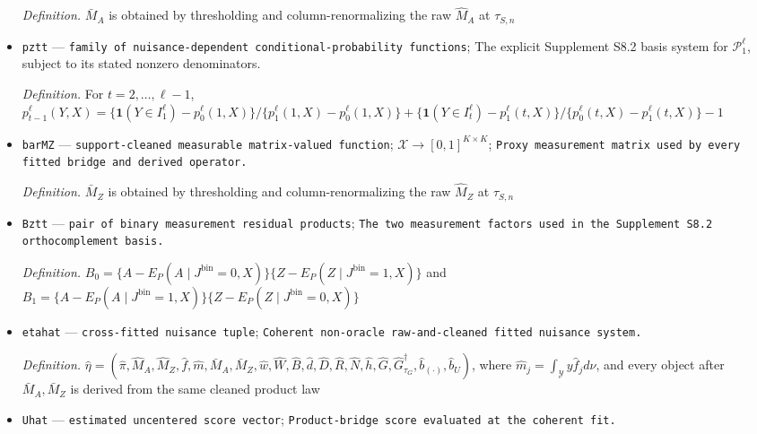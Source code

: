 \documentclass{article}
\begin{document}
\begin{itemize}
  \par\smallskip\noindent\emph{Definition.} \(\bar M_A\) is obtained by thresholding and column-renormalizing the raw \(\widehat M_A\) at \(\tau_{S,n}\)
  \item \texttt{pztt} --- \texttt{family of nuisance-\allowbreak{}dependent conditional-\allowbreak{}probability functions}; The explicit Supplement S8.2 basis system for \(\mathcal P_1^{\ell}\), subject to its stated nonzero denominators.
  \par\smallskip\noindent\emph{Definition.} For \(t=2,\ldots,\ell-1\), \(p_{t-1}^{\ell}(Y,X)=\{\mathbf 1(Y\in I_1^{\ell})-p_0^{\ell}(1,X)\}/\{p_1^{\ell}(1,X)-p_0^{\ell}(1,X)\}+\{\mathbf 1(Y\in I_t^{\ell})-p_1^{\ell}(t,X)\}/\{p_0^{\ell}(t,X)-p_1^{\ell}(t,X)\}-1\)
  \item \texttt{barMZ} --- \texttt{support-\allowbreak{}cleaned measurable matrix-\allowbreak{}valued function}; \(\mathcal X\to[0,1]^{K\times K}\); \texttt{Proxy measurement matrix used by every fitted bridge and derived operator.}
  \par\smallskip\noindent\emph{Definition.} \(\bar M_Z\) is obtained by thresholding and column-renormalizing the raw \(\widehat M_Z\) at \(\tau_{S,n}\)
  \item \texttt{Bztt} --- \texttt{pair of binary measurement residual products}; \texttt{The two measurement factors used in the Supplement S8.2 orthocomplement basis.}
  \par\smallskip\noindent\emph{Definition.} \(B_0=\{A-E_P(A\mid J^{\mathrm{bin}}=0,X)\}\{Z-E_P(Z\mid J^{\mathrm{bin}}=1,X)\}\) and \(B_1=\{A-E_P(A\mid J^{\mathrm{bin}}=1,X)\}\{Z-E_P(Z\mid J^{\mathrm{bin}}=0,X)\}\)
  \item \texttt{etahat} --- \texttt{cross-\allowbreak{}fitted nuisance tuple}; \texttt{Coherent non-\allowbreak{}oracle raw-\allowbreak{}and-\allowbreak{}cleaned fitted nuisance system.}
  \par\smallskip\noindent\emph{Definition.} \(\widehat\eta=(\widehat\pi,\widehat M_A,\widehat M_Z,\widehat f,\widehat m,\bar M_A,\bar M_Z,\widehat w,\widehat W,\widehat B,\widehat d,\widehat D,\widehat R,\widehat N,\widehat h,\widehat G,\widehat G_{\tau_G}^{\dagger},\widehat b_{(\cdot)},\widehat b_U)\), where \(\widehat m_j=\int_{\mathcal Y}y\widehat f_jd\nu\), and every object after \(\bar M_A,\bar M_Z\) is derived from the same cleaned product law
  \item \texttt{Uhat} --- \texttt{estimated uncentered score vector}; \texttt{Product-\allowbreak{}bridge score evaluated at the coherent fit.}

\end{itemize}
\end{document}
